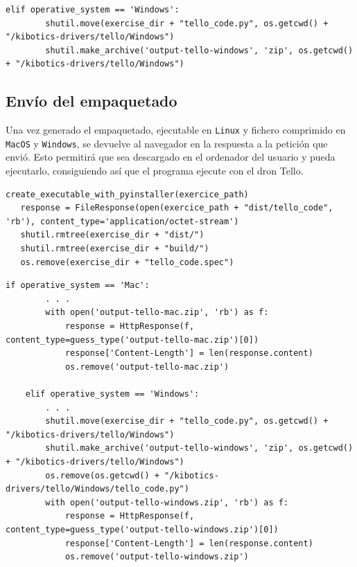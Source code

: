 \documentclass{report}
\begin{document}
\begin{itemize}
\begin{lstlisting}[frame=single,breaklines=true, label=Creación empaquetado en Windows y MacOS, caption=Creación empaquetado y respuesta en Windows y MacOS,  captionpos=b]
    elif operative_system == 'Windows':
        shutil.move(exercise_dir + "tello_code.py", os.getcwd() + "/kibotics-drivers/tello/Windows")
        shutil.make_archive('output-tello-windows', 'zip', os.getcwd() + "/kibotics-drivers/tello/Windows")

\end{lstlisting}	

\end{itemize}


\subsection{Envío del empaquetado}

Una vez generado el empaquetado, ejecutable en \texttt{Linux} y fichero comprimido en \texttt{MacOS} y \texttt{Windows}, se devuelve al navegador en la respuesta a la petición que envió. Esto permitirá que sea descargado en el ordenador del usuario y pueda ejecutarlo, consiguiendo así que el programa ejecute con el dron Tello.
	\\
\begin{lstlisting}[frame=single,breaklines=true, label=Respuesta a la petición para Linux, caption=Respuesta a la petición para Linux,  captionpos=b]
   create_executable_with_pyinstaller(exercice_path)
   response = FileResponse(open(exercice_path + "dist/tello_code", 'rb'), content_type='application/octet-stream')
   shutil.rmtree(exercise_dir + "dist/")
   shutil.rmtree(exercise_dir + "build/")
   os.remove(exercise_dir + "tello_code.spec")
\end{lstlisting}
\begin{lstlisting}[frame=single,breaklines=true, label=Respuesta con empaquetado en Windows y MacOS, caption=Creación empaquetado y respuesta en Windows y MacOS,  captionpos=b]
   if operative_system == 'Mac':
        . . . 
        with open('output-tello-mac.zip', 'rb') as f:
            response = HttpResponse(f, content_type=guess_type('output-tello-mac.zip')[0])
            response['Content-Length'] = len(response.content)
            os.remove('output-tello-mac.zip')

    elif operative_system == 'Windows':
        . . .
        shutil.move(exercise_dir + "tello_code.py", os.getcwd() + "/kibotics-drivers/tello/Windows")
        shutil.make_archive('output-tello-windows', 'zip', os.getcwd() + "/kibotics-drivers/tello/Windows")
        os.remove(os.getcwd() + "/kibotics-drivers/tello/Windows/tello_code.py")
        with open('output-tello-windows.zip', 'rb') as f:
            response = HttpResponse(f, content_type=guess_type('output-tello-windows.zip')[0])
            response['Content-Length'] = len(response.content)
            os.remove('output-tello-windows.zip')
\end{lstlisting}	
\end{document}
